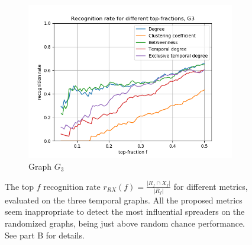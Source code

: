 \documentclass[letterpaper]{article}
\begin{document}
\begin{figure}
\begin{subfigure}[b]{0.32\textwidth}
        \includegraphics[width=\textwidth]{img/rankG3.png}
        \caption{Graph \(G_3\)}
	    \label{fig:recognition_rates_G3}
    \end{subfigure}
    \caption{\small{The top $f$ recognition rate $r_{RX}(f) = \frac{ |R_f \cap X_f| }{ |R_f| }$ for different metrics, evaluated on the three temporal graphs. All the proposed metrics seem inappropriate to detect the most influential spreaders on the randomized graphs, being just above random chance performance. See part B for details.}}
    \label{fig:recognition_rates}
	
	\bigskip
	

\end{figure}
\end{document}
